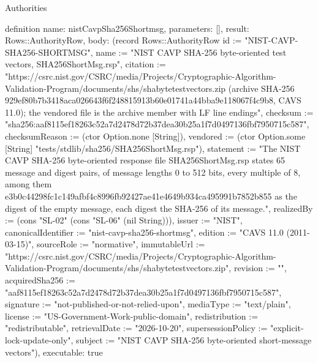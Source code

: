 \begin{lexlean}{Authorities}
\begin{semanticmodule}
definition{
  name: nistCavpSha256Shortmsg,
  parameters: [],
  result: Rows::AuthorityRow,
  body: (record Rows::AuthorityRow {id := "NIST-CAVP-SHA256-SHORTMSG", name := "NIST CAVP SHA-256 byte-oriented test vectors, SHA256ShortMsg.rsp", citation := "https://csrc.nist.gov/CSRC/media/Projects/Cryptographic-Algorithm-Validation-Program/documents/shs/shabytetestvectors.zip (archive SHA-256 929ef80b7b3418aca026643f6f248815913b60e01741a44bba9e118067f4c9b8, CAVS 11.0); the vendored file is the archive member with LF line endings", checksum := "sha256:aaf8115ef18263c52a7d2478d72b37dea30b25a1f7d0497136fbf7950715c587", checksumReason := (ctor Option.none [String]), vendored := (ctor Option.some [String] "tests/stdlib/sha256/SHA256ShortMsg.rsp"), statement := "The NIST CAVP SHA-256 byte-oriented response file SHA256ShortMsg.rsp states 65 message and digest pairs, of message lengths 0 to 512 bits, every multiple of 8, among them e3b0c44298fc1c149afbf4c8996fb92427ae41e4649b934ca495991b7852b855 as the digest of the empty message, each digest the SHA-256 of its message.", realizedBy := (cons "SL-02" (cons "SL-06" (nil String))), issuer := "NIST", canonicalIdentifier := "nist-cavp-sha256-shortmsg", edition := "CAVS 11.0 (2011-03-15)", sourceRole := "normative", immutableUrl := "https://csrc.nist.gov/CSRC/media/Projects/Cryptographic-Algorithm-Validation-Program/documents/shs/shabytetestvectors.zip", revision := "", acquiredSha256 := "aaf8115ef18263c52a7d2478d72b37dea30b25a1f7d0497136fbf7950715c587", signature := "not-published-or-not-relied-upon", mediaType := "text/plain", license := "US-Government-Work-public-domain", redistribution := "redistributable", retrievalDate := "2026-10-20", supersessionPolicy := "explicit-lock-update-only", subject := "NIST CAVP SHA-256 byte-oriented short-message vectors"}),
  executable: true
}


\end{semanticmodule}
\end{lexlean}

